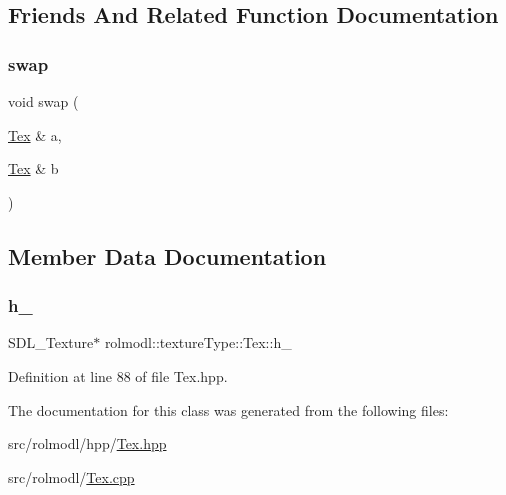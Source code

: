 \subsection{Friends And Related Function Documentation}
\mbox{\label{classrolmodl_1_1texture_type_1_1_tex_a744fbfe68b849702086e95bc2a32286d}} 
\subsubsection{\texorpdfstring{swap}{swap}}
{\footnotesize\ttfamily void swap (\begin{DoxyParamCaption}\item[{\mbox{\hyperlink{classrolmodl_1_1texture_type_1_1_tex}{Tex}} \&}]{a,  }\item[{\mbox{\hyperlink{classrolmodl_1_1texture_type_1_1_tex}{Tex}} \&}]{b }\end{DoxyParamCaption})\hspace{0.3cm}{\ttfamily [friend]}}



\subsection{Member Data Documentation}
\mbox{\label{classrolmodl_1_1texture_type_1_1_tex_afda4b73ec178af883ecbb0226c2842dd}} 
\subsubsection{\texorpdfstring{h\_}{h\_}}
{\footnotesize\ttfamily S\+D\+L\+\_\+\+Texture$\ast$ rolmodl\+::texture\+Type\+::\+Tex\+::h\+\_\+\hspace{0.3cm}{\ttfamily [protected]}}



Definition at line 88 of file Tex.\+hpp.



The documentation for this class was generated from the following files\+:\begin{DoxyCompactItemize}
\item 
src/rolmodl/hpp/\mbox{\hyperlink{_tex_8hpp}{Tex.\+hpp}}\item 
src/rolmodl/\mbox{\hyperlink{_tex_8cpp}{Tex.\+cpp}}\end{DoxyCompactItemize}
